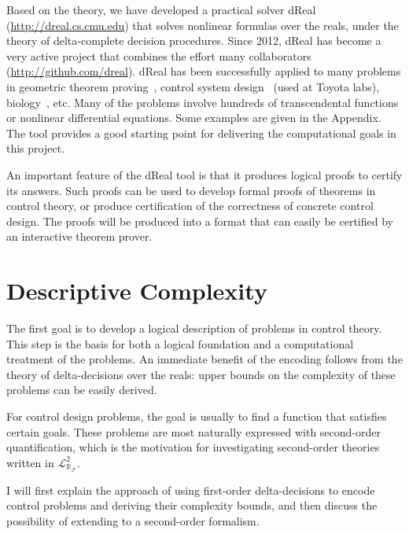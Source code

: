 \documentclass[10pt]{article}
\newcommand{\lrf}{\mathcal{L}_{\mathbb{R}_{\mathcal{F}}}}
\theoremstyle{definition}
\begin{document}
Based on the theory, we have developed a practical solver dReal~\cite{DBLP:conf/cade/GaoKC13,DBLP:conf/fmcad/GaoKC13} (\url{http://dreal.cs.cmu.edu}) that solves nonlinear formulas over the reals, under the theory of delta-complete decision procedures. Since 2012, dReal has become a very active project that combines the effort many collaborators (\url{http://github.com/dreal}). dReal has been successfully applied to many problems in geometric theorem proving~\cite{DBLP:conf/cade/GaoKC13}, control system design~\cite{DBLP:conf/fmcad/GaoKC13,DBLP:conf/hybrid/KapinskiDSA14} (used at Toyota labs), biology~\cite{DBLP:conf/fmcad/GaoKC13}, etc. Many of the problems involve hundreds of transcendental functions or nonlinear differential equations. Some examples are given in the Appendix. The tool provides a good starting point for delivering the computational goals in this project.

An important feature of the dReal tool is that it produces logical proofs to certify its answers. Such proofs can be used to develop formal proofs of theorems in control theory, or produce certification of the correctness of concrete control design. The proofs will be produced into a format that can easily be certified by an interactive theorem prover. 

\section{Descriptive Complexity}\label{dc}

The first goal is to develop a logical description of problems in control theory. This step is the basis for both a logical foundation and a computational treatment of the problems. An immediate benefit of the encoding follows from the theory of delta-decisions over the reals: upper bounds on the complexity of these problems can be easily derived. 

For control design problems, the goal is usually to find a function that satisfies certain goals. These problems are most naturally expressed with second-order quantification, which is the motivation for investigating second-order theories written in $\lrf^2$. 

I will first explain the approach of using first-order delta-decisions to encode control problems and deriving their complexity bounds, and then discuss the possibility of extending to a second-order formalism. 
\end{document}
